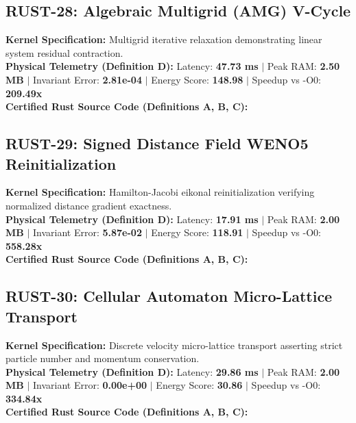 \vspace{1em}
\subsection{RUST-28: Algebraic Multigrid (AMG) V-Cycle}
\textbf{Kernel Specification:} Multigrid iterative relaxation demonstrating linear system residual contraction.\\
\textbf{Physical Telemetry (Definition D):} Latency: \textbf{47.73 ms} $|$ Peak RAM: \textbf{2.50 MB} $|$ Invariant Error: \textbf{2.81e-04} $|$ Energy Score: \textbf{148.98} $|$ Speedup vs -O0: \textbf{209.49x}\\

\textbf{Certified Rust Source Code (Definitions A, B, C):}


\vspace{1em}
\subsection{RUST-29: Signed Distance Field WENO5 Reinitialization}
\textbf{Kernel Specification:} Hamilton-Jacobi eikonal reinitialization verifying normalized distance gradient exactness.\\
\textbf{Physical Telemetry (Definition D):} Latency: \textbf{17.91 ms} $|$ Peak RAM: \textbf{2.00 MB} $|$ Invariant Error: \textbf{5.87e-02} $|$ Energy Score: \textbf{118.91} $|$ Speedup vs -O0: \textbf{558.28x}\\

\textbf{Certified Rust Source Code (Definitions A, B, C):}


\vspace{1em}
\subsection{RUST-30: Cellular Automaton Micro-Lattice Transport}
\textbf{Kernel Specification:} Discrete velocity micro-lattice transport asserting strict particle number and momentum conservation.\\
\textbf{Physical Telemetry (Definition D):} Latency: \textbf{29.86 ms} $|$ Peak RAM: \textbf{2.00 MB} $|$ Invariant Error: \textbf{0.00e+00} $|$ Energy Score: \textbf{30.86} $|$ Speedup vs -O0: \textbf{334.84x}\\

\textbf{Certified Rust Source Code (Definitions A, B, C):}


